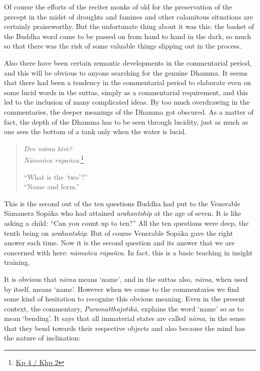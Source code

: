Of course the efforts of the reciter monks of old for the preservation of the precept in the midst of droughts and famines and other calamitous situations are certainly praiseworthy. But the unfortunate thing about it was this: the basket of the Buddha word came to be passed on from hand to hand in the dark, so much so that there was the risk of some valuable things slipping out in the process.

Also there have been certain semantic developments in the commentarial period, and this will be obvious to anyone searching for the genuine Dhamma. It seems that there had been a tendency in the commentarial period to elaborate even on some lucid words in the suttas, simply as a commentarial requirement, and this led to the inclusion of many complicated ideas. By too much overdrawing in the commentaries, the deeper meanings of the Dhamma got obscured. As a matter of fact, the depth of the Dhamma has to be seen through lucidity, just as much as one sees the bottom of a tank only when the water is lucid.

\begin{quote}
\emph{Dve nāma kiṁ?}\\
\emph{Nāmañca rūpañca}.\footnote{\href{https://suttacentral.net/kp4/pli/ms}{Kp 4 / Khp 2}}

``What is the `two'?''\\
``Name and form.''
\end{quote}

This is the second out of the ten questions Buddha had put to the Venerable Sāmanera Sopāka who had attained \emph{arahantship} at the age of seven. It is like asking a child: ``Can you count up to ten?'' All the ten questions were deep, the tenth being on \emph{arahantship}. But of course Venerable Sopāka gave the right answer each time. Now it is the second question and its answer that we are concerned with here: \emph{nāmañca rūpañca}. In fact, this is a basic teaching in insight training.

It is obvious that \emph{nāma} means `name', and in the suttas also, \emph{nāma}, when used by itself, means `name'. However when we come to the commentaries we find some kind of hesitation to recognize this obvious meaning. Even in the present context, the commentary, \emph{Paramatthajotikā}, explains the word `name' so as to mean `bending'. It says that all immaterial states are called \emph{nāma}, in the sense that they bend towards their respective objects and also because the mind has the nature of inclination:

